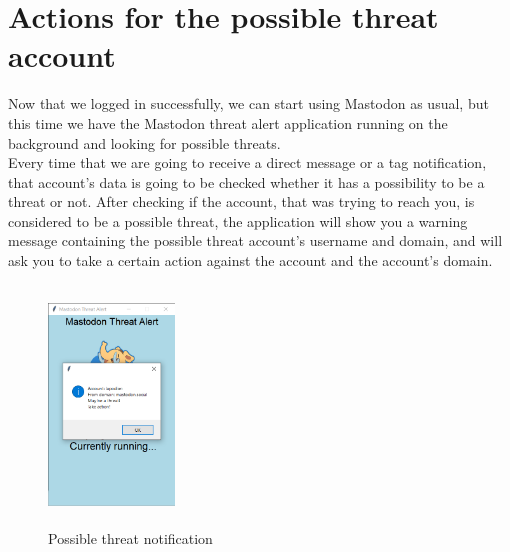 \section{Actions for the possible threat account}
\label{s:Actions_threat}
Now that we logged in successfully, we can start using Mastodon as usual, but this
time we have the Mastodon threat alert application running on the background and looking
for possible threats.
\\[5pt]
Every time that we are going to receive a direct message or a tag notification, that account's data is going to be checked whether it has a possibility to be a threat or not. After checking
if the account, that was trying to reach you, is considered to be a possible threat, the application
will show you a warning message containing the possible threat account's username and domain,
and will ask you to take a certain action against the account and the account's domain.
\begin{figure}[H]
	\centering
	\includegraphics[width=0.3\textwidth,height=240px]{images/threatnotif.png}
	\caption{Possible threat notification}
	\label{fig:possible_threat_notification}
\end{figure}

